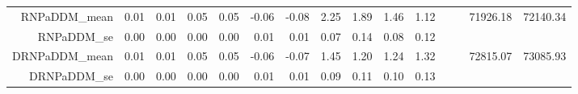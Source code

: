 \begin{table}[ht]
\begin{tabular}{rrrrrrrrrrrrrrr}
  RNPaDDM\_mean & 0.01 & 0.01 & 0.05 & 0.05 & -0.06 & -0.08 & 2.25 & 1.89 & 1.46 & 1.12 &  &  & 71926.18 & 72140.34 \\ 
  RNPaDDM\_se & 0.00 & 0.00 & 0.00 & 0.00 & 0.01 & 0.01 & 0.07 & 0.14 & 0.08 & 0.12 &  &  &  &  \\ 
  DRNPaDDM\_mean & 0.01 & 0.01 & 0.05 & 0.05 & -0.06 & -0.07 & 1.45 & 1.20 & 1.24 & 1.32 &  &  & 72815.07 & 73085.93 \\ 
  DRNPaDDM\_se & 0.00 & 0.00 & 0.00 & 0.00 & 0.01 & 0.01 & 0.09 & 0.11 & 0.10 & 0.13 &  &  &  &  \\ 
   \hline
\end{tabular}
\end{table}
